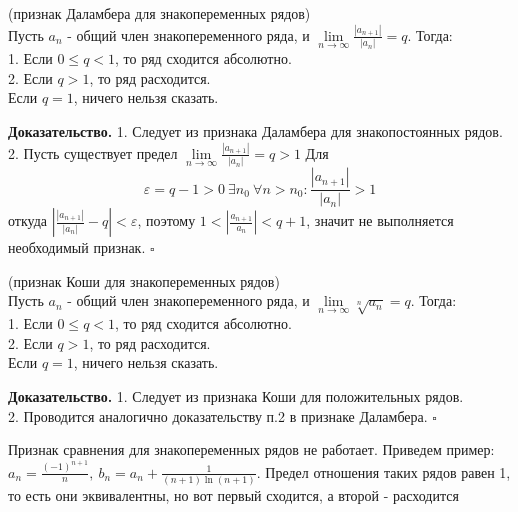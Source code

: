 \begin{theor}
    (признак Даламбера для знакопеременных рядов)\\
    Пусть $a_n$ - общий член знакопеременного ряда, 
    и $\lim\limits_{n \to \infty} \frac{|a_{n+1}|}{|a_n|}=q$.
    Тогда:\\
    1. Если $0\leqslant q<1$, то ряд сходится абсолютно.\\
    2. Если $q>1$, то ряд расходится.\\
    Если $q=1$, ничего нельзя сказать.
\end{theor}
\textbf{Доказательство.} 
1. Следует из признака Даламбера для знакопостоянных рядов.\\
2. Пусть существует предел 
$\lim\limits_{n \to \infty} \frac{|a_{n+1}|}{|a_n|}=q>1$ Для
$$\varepsilon=q-1>0~\exists n_0~\forall n>n_0:\frac{|a_{n+1}|}{|a_n|}>1$$
откуда $\left|\frac{|a_{n+1}|}{|a_n|}-q\right|<\varepsilon$, 
поэтому $1<\left| \frac{a_{n+1}}{a_n} \right|<q+1$, значит не выполняется
необходимый признак. $\square$ 
\begin{theor}
    (признак Коши для знакопеременных рядов)\\
    Пусть $a_n$ - общий член знакопеременного ряда, 
    и $\lim\limits_{n \to \infty} \sqrt[n]{a_n}=q$.
    Тогда:\\
    1. Если $0\leqslant q<1$, то ряд сходится абсолютно.\\
    2. Если $q>1$, то ряд расходится.\\
    Если $q=1$, ничего нельзя сказать.

\end{theor}
\textbf{Доказательство.}
1. Следует из признака Коши для положительных рядов.\\
2. Проводится аналогично доказательству п.2 в признаке Даламбера.
$\square$ 

Признак сравнения для знакопеременных рядов не работает. Приведем 
пример: $a_n=\frac{(-1)^{n+1}}{n},~b_n=a_n+\frac{1}{(n+1)\ln(n+1)}$. 
Предел отношения таких рядов равен 1, то есть они эквивалентны, но вот
первый сходится, а второй - расходится %
